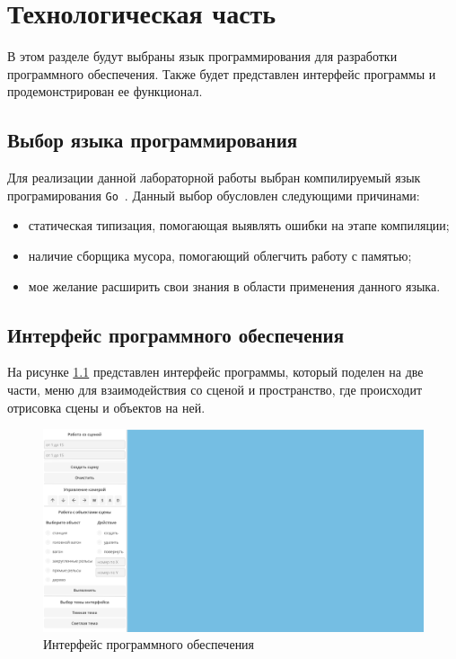 \chapter{Технологическая часть}

В этом разделе будут выбраны язык программирования для разработки программного обеспечения. 
Также будет представлен интерфейс программы и продемонстрирован ее функционал.

\section{Выбор языка программирования}

Для реализации данной лабораторной работы выбран компилируемый
язык програмирования \texttt{Go}~\cite{golang}. Данный выбор обусловлен следующими причинами:

\begin{itemize}
    \item статическая типизация, помогающая выявлять ошибки на этапе компиляции;
    \item наличие сборщика мусора, помогающий облегчить работу с памятью;
    \item мое желание расширить свои знания в области применения данного языка.
\end{itemize}

\section{Интерфейс программного обеспечения}

На рисунке \ref{img:inter} представлен интерфейс программы, который поделен на две части, меню для взаимодействия со сценой и пространство, 
где происходит отрисовка сцены и объектов на ней.

\clearpage
\begin{figure}[h]
    \includegraphics[width=1\linewidth]{img/inter.png}
    \caption{Интерфейс программного обеспечения}
    \label{img:inter}
\end{figure}
\noindent

